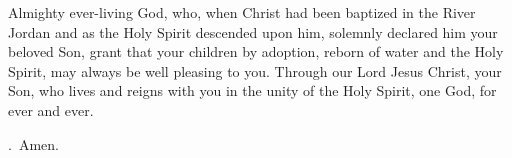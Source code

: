 \lettrine[lines=3]{A}{}lmighty ever-living God,
who, when Christ had been baptized in the River Jordan
and as the Holy Spirit descended upon him,
solemnly declared him your beloved Son,
grant that your children by adoption,
reborn of water and the Holy Spirit,
may always be well pleasing to you.
Through our Lord Jesus Christ, your Son,
who lives and reigns with you in the unity of the Holy Spirit,
one God, for ever and ever.
\par \Rbar.~Amen.
